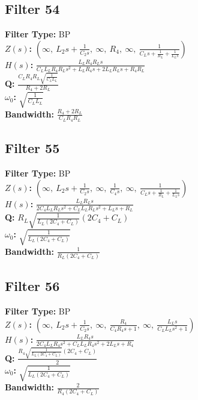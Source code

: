 \documentclass{article}
\begin{document}
\subsection*{Filter 54}
\textbf{Filter Type:} BP \\ 
\textbf{$Z(s)$:} $\left( \infty, \  L_{2} s + \frac{1}{C_{2} s}, \  \infty, \  R_{4}, \  \infty, \  \frac{1}{C_{L} s + \frac{1}{R_{L}} + \frac{1}{L_{L} s}}\right)$ \\ 
\textbf{$H(s)$:} $\frac{L_{L} R_{4} R_{L} s}{C_{L} L_{L} R_{4} R_{L} s^{2} + L_{L} R_{4} s + 2 L_{L} R_{L} s + R_{4} R_{L}}$ \\ 
\textbf{Q:} $\frac{C_{L} R_{4} R_{L} \sqrt{\frac{1}{C_{L} L_{L}}}}{R_{4} + 2 R_{L}}$ \\ 
\textbf{$\omega_0$:} $\sqrt{\frac{1}{C_{L} L_{L}}}$ \\ 
\textbf{Bandwidth:} $\frac{R_{4} + 2 R_{L}}{C_{L} R_{4} R_{L}}$ \\ 
\subsection*{Filter 55}
\textbf{Filter Type:} BP \\ 
\textbf{$Z(s)$:} $\left( \infty, \  L_{2} s + \frac{1}{C_{2} s}, \  \infty, \  \frac{1}{C_{4} s}, \  \infty, \  \frac{1}{C_{L} s + \frac{1}{R_{L}} + \frac{1}{L_{L} s}}\right)$ \\ 
\textbf{$H(s)$:} $\frac{L_{L} R_{L} s}{2 C_{4} L_{L} R_{L} s^{2} + C_{L} L_{L} R_{L} s^{2} + L_{L} s + R_{L}}$ \\ 
\textbf{Q:} $R_{L} \sqrt{\frac{1}{L_{L} \left(2 C_{4} + C_{L}\right)}} \left(2 C_{4} + C_{L}\right)$ \\ 
\textbf{$\omega_0$:} $\sqrt{\frac{1}{L_{L} \left(2 C_{4} + C_{L}\right)}}$ \\ 
\textbf{Bandwidth:} $\frac{1}{R_{L} \left(2 C_{4} + C_{L}\right)}$ \\ 
\subsection*{Filter 56}
\textbf{Filter Type:} BP \\ 
\textbf{$Z(s)$:} $\left( \infty, \  L_{2} s + \frac{1}{C_{2} s}, \  \infty, \  \frac{R_{4}}{C_{4} R_{4} s + 1}, \  \infty, \  \frac{L_{L} s}{C_{L} L_{L} s^{2} + 1}\right)$ \\ 
\textbf{$H(s)$:} $\frac{L_{L} R_{4} s}{2 C_{4} L_{L} R_{4} s^{2} + C_{L} L_{L} R_{4} s^{2} + 2 L_{L} s + R_{4}}$ \\ 
\textbf{Q:} $\frac{R_{4} \sqrt{\frac{1}{L_{L} \left(2 C_{4} + C_{L}\right)}} \left(2 C_{4} + C_{L}\right)}{2}$ \\ 
\textbf{$\omega_0$:} $\sqrt{\frac{1}{L_{L} \left(2 C_{4} + C_{L}\right)}}$ \\ 
\textbf{Bandwidth:} $\frac{2}{R_{4} \left(2 C_{4} + C_{L}\right)}$ \\ 
\end{document}
